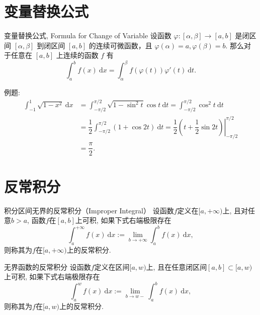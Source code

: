 

\section{变量替换公式}


\begin{frame}

\begin{block}{变量替换公式, Formula for Change of Variable}
设函数 $\varphi: [\alpha,\beta] \to [a,b]$ 是闭区间 $[\alpha,\beta]$ 到闭区间 $[a,b]$ 的连续可微函数，且 $\varphi(\alpha) = a, \varphi(\beta) = b$. 那么对于任意在 $[a,b]$ 上连续的函数 $f$ 有
\[
\int_a^b f(x) ~ \mathrm{d}x = \int_{\alpha}^{\beta} f(\varphi(t))\varphi'(t) ~ \mathrm{d}t.
\]
\end{block}

\pause

例题:
\begin{align*}
\int_{-1}^{1} \sqrt{1-x^2} ~ \mathrm{d}x & = \int_{-\pi/2}^{\pi/2} \sqrt{1-\sin^2t}\cos t ~ \mathrm{d}t = \int_{-\pi/2}^{\pi/2} \cos^2 t ~ \mathrm{d}t \\
& = \dfrac{1}{2} \int_{-\pi/2}^{\pi/2} (1+\cos 2t) ~ \mathrm{d}t = \left.\dfrac{1}{2}\left(t + \dfrac{1}{2}\sin 2t \right)\right\vert_{-\pi/2}^{\pi/2} \\
& = \dfrac{\pi}{2}.
\end{align*}

\end{frame}


\section{反常积分}


\begin{frame}

\begin{block}{积分区间无界的反常积分（Improper Integral）}
设函数$f$定义在$[a,+\infty)$上, 且对任意$b>a$, 函数$f$在$[a,b]$上可积, 如果下式右端极限存在
\[\int_a^{+\infty} f(x) ~ \mathrm{d}x := \lim\limits_{b\to+\infty} \int_a^b f(x) ~ \mathrm{d}x,\]
则称其为$f$在$[a,+\infty)$上的反常积分.
\end{block}

\pause

\begin{block}{无界函数的反常积分}
设函数$f$定义在区间$[a,w)$上, 且在任意闭区间$[a,b]\subset [a,w)$上可积, 如果下式右端极限存在
\[\int_a^w f(x) ~ \mathrm{d}x := \lim\limits_{b\to w-} \int_a^b f(x) ~ \mathrm{d}x,\]
则称其为$f$在$[a,w)$上的反常积分.
\end{block}

\end{frame}

